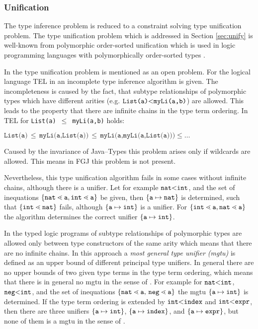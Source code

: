 \subsubsection*{Unification}
The type inference problem is reduced to a constraint solving type unification
problem. 
The type unification problem which is addressed in Section \ref{sec:unify} is
well-known from polymorphic order-sorted unification which is used in logic
programming languages with polymorphically order-sorted types
\cite{GS89,MH91,HiTo92,CB95}.

In \cite{GS89} the type unification problem
is mentioned as an open problem. For the logical language \textsf{TEL} in
\cite{GS89} an incomplete type inference algorithm is given. The incompleteness
is caused by the fact, that subtype relationships
of polymorphic types which have different arities  (e.g. $\texttt{List(a)} \mbox{$<$}
\texttt{myLi(a,b)}$) are allowed. This leads to the property that there are
infinite chains in the type term ordering. In \textsf{TEL} for \texttt{List(a)}
$\,\leq\,$ \texttt{myLi(a,b)} holds: 

\smallskip
{\centering $\texttt{List(a)} \,\leq\, \texttt{myLi(a,List(a))} \,\leq\,
\texttt{myLi(a,myLi(a,List(a)))}  \leq \ldots$\\}

Caused by the invariance of Java--Types this problem arises only if wildcards
are allowed. This means in FGJ this problem is not present.

Nevertheless, this type unification algorithm
fails in some cases without infinite chains, although there is a unifier. Let
for example $\texttt{nat} 
\mbox{$<$} \texttt{int}$, and the set of inequations $\{ \mathtt{nat} \lessdot \mathtt{a}, \mathtt{int}
  \lessdot \mathtt{a} \}$ be given, then $\{ \mathtt{a} \mapsto \mathtt{nat} \}$
is determined, such that 
$\{ \mathtt{int} \lessdot \mathtt{nat} \}$ fails, although $\{ \mathtt{a}\mapsto \mathtt{int} \}$ is
a unifier. For $\{ \mathtt{int} \lessdot \mathtt{a}, \mathtt{nat} \lessdot
  \mathtt{a} \}$ the algorithm determines the correct unifier
$\{ \mathtt{a}\mapsto \mathtt{int} \}$.

In the typed logic programs of \cite{HiTo92} subtype
relationships of polymorphic types are allowed only between type
constructors of the same arity which means that there are no infinite chains.
In this approach a \emph{most general type unifier (mgtu)} is
defined as an upper bound of different principal type unifiers. In general
there are no upper bounds of two given type terms in the type term ordering,
which means that there is in general no mgtu in the sense of \cite{HiTo92}.
For example for  $\texttt{nat} \mbox{$<$} \texttt{int}$, $\texttt{neg} 
\mbox{$<$} \texttt{int}$, and the set of inequations $\set{\mathtt{nat} \lessdot
  \mathtt{a}$, $\mathtt{neg} \lessdot \mathtt{a}}$ the mgtu $\{ \mathtt{a} \mapsto \texttt{int} \}$ is
determined. If the type term ordering is extended by $\mathtt{int} \mbox{$<$}
\mathtt{index}$ and $\mathtt{int} \mbox{$<$} \mathtt{expr}$, then there are three
unifiers $\{ \mathtt{a} \mapsto \texttt{int} \}$, $\{ \mathtt{a} \mapsto
  \mathtt{index} \}$, and $\{ \mathtt{a} \mapsto 
\mathtt{expr} \}$, but none of them is a mgtu in the sense of \cite{HiTo92}.

